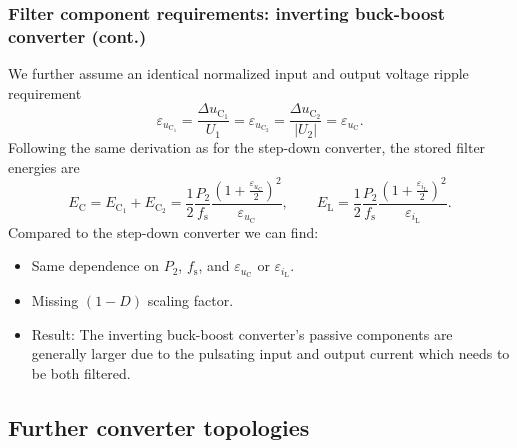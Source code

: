 \begin{frame}
	\frametitle{Filter component requirements: inverting buck-boost converter (cont.)}
	\onslide<+->We further assume an identical normalized input and output voltage ripple requirement
	$$
		\varepsilon_{u_\mathrm{C_1}} =\frac{\Delta u_\mathrm{C_1}}{U_1} =  \varepsilon_{u_\mathrm{C_2}} = \frac{\Delta u_\mathrm{C_2}}{|U_2|} = \varepsilon_{u_\mathrm{C}}.
	$$\onslide<+->
	Following the same derivation as for the step-down converter, the stored filter energies are
	\begin{equation}
		E_\mathrm{C} = E_\mathrm{C_1} + E_\mathrm{C_2} = \frac{1}{2} \frac{P_2}{f_\mathrm{s}}\frac{\left(1+\frac{\varepsilon_{u_\mathrm{C}}}{2}\right)^2}{\varepsilon_{u_\mathrm{C}}}, \qquad
		E_\mathrm{L} = \frac{1}{2} \frac{P_2}{f_\mathrm{s}}\frac{\left(1+\frac{\varepsilon_{i_\mathrm{L}}}{2}\right)^2}{\varepsilon_{i_\mathrm{L}}}.
	\end{equation}\onslide<3->
	Compared to the step-down converter we can find:
	\begin{itemize}
		\item<3-> Same dependence on $P_2$, $f_\mathrm{s}$, and $\varepsilon_{u_\mathrm{C}}$ or $\varepsilon_{i_\mathrm{L}}$.
		\item<4-> Missing $(1-D)$ scaling factor.
		\item<4-> Result: The inverting buck-boost converter's passive components are generally larger due to the pulsating input and output current which needs to be both filtered.
	\end{itemize}
\end{frame}

\subsection{Further converter topologies}


